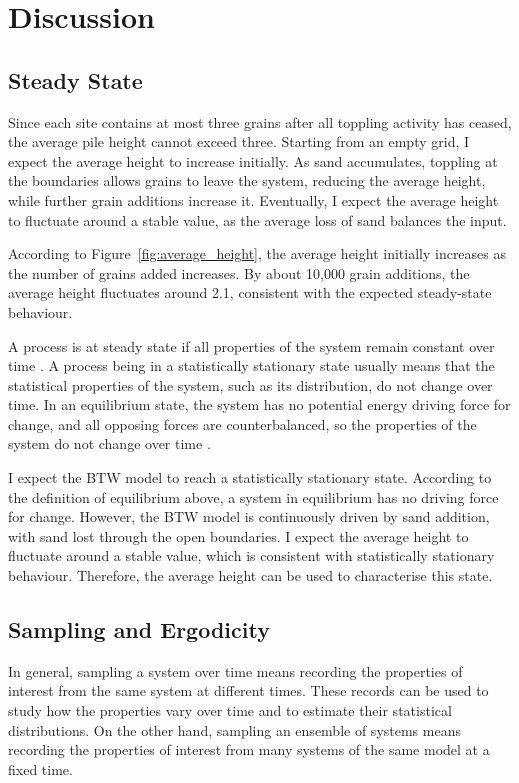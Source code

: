 \chapter{Discussion}\label{ch: discussion}

\section{Steady State}

Since each site contains at most three grains after all toppling activity has ceased, the average pile height cannot exceed three. Starting from an empty grid, I expect the average height to increase initially. As sand accumulates, toppling at the boundaries allows grains to leave the system, reducing the average height, while further grain additions increase it. Eventually, I expect the average height to fluctuate around a stable value, as the average loss of sand balances the input.

According to Figure~\ref{fig:average_height}, the average height initially increases as the number of grains added increases. By about 10,000 grain additions, the average height fluctuates around 2.1, consistent with the expected steady-state behaviour.

A process is at steady state if all properties of the system remain constant over time \cite{DORAN202581}. A process being in a statistically stationary state usually means that the statistical properties of the system, such as its distribution, do not change over time. In an equilibrium state, the system has no potential energy driving force for change, and all opposing forces are counterbalanced, so the properties of the system do not change over time \cite{DORAN202581}.

I expect the BTW model to reach a statistically stationary state. According to the definition of equilibrium above, a system in equilibrium has no driving force for change. However, the BTW model is continuously driven by sand addition, with sand lost through the open boundaries. I expect the average height to fluctuate around a stable value, which is consistent with statistically stationary behaviour.
Therefore, the average height can be used to characterise this state.

\section{Sampling and Ergodicity}

In general, sampling a system over time means recording the properties of interest from the same system at different times. These records can be used to study how the properties vary over time and to estimate their statistical distributions. On the other hand, sampling an ensemble of systems means recording the properties of interest from many systems of the same model at a fixed time\cite{Frigg_Werndl_2024}.

